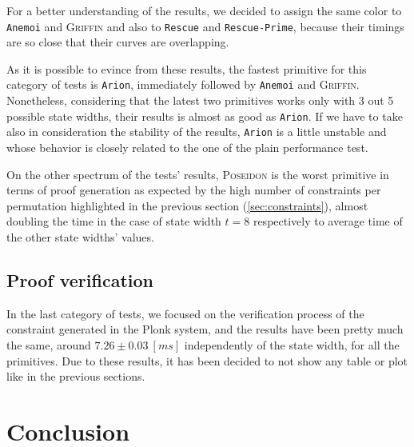 \documentclass[12pt, a4paper]{report}
\begin{document}
For a better understanding of the results, we decided to assign the same color to \texttt{Anemoi} and \textsc{Griffin} and also to \texttt{Rescue} and \texttt{Rescue-Prime}, because their timings are so close that their curves are overlapping.

As it is possible to evince from these results, the fastest primitive for this category of tests is \texttt{Arion}, immediately followed by \texttt{Anemoi} and \textsc{Griffin}.
Nonetheless, considering that the latest two primitives works only with 3 out 5 possible state widths, their results is almost as good as \texttt{Arion}.
If we have to take also in consideration the stability of the results, \texttt{Arion} is a little unstable and whose behavior is closely related to the one of the plain performance test.

On the other spectrum of the tests' results, \textsc{Poseidon} is the worst primitive in terms of proof generation as expected by the high number of constraints per permutation highlighted in the previous section (\ref{sec:constraints}), almost doubling the time in the case of state width $t = 8$ respectively to average time of the other state widths' values.

\section{Proof verification}\label{sec:proofver}

In the last category of tests, we focused on the verification process of the constraint generated in the Plonk system, and the results have been pretty much the same, around $7.26\pm0.03\ [ms]$ independently of the state width, for all the primitives.
Due to these results, it has been decided to not show any table or plot like in the previous sections.

\chapter{Conclusion}\label{chap:conclusion}
\end{document}
